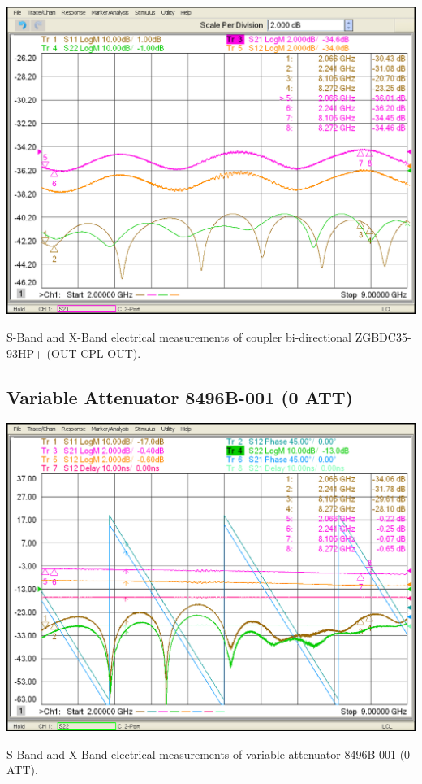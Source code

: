 \begin{table}[H]
	\centering
	\includegraphics[width=0.8\linewidth]{figuras/measures/Coupler ZGBDC35-93HP+ (OUT-CPL OUT)}
	\caption{S-Band and X-Band electrical measurements of coupler bi-directional ZGBDC35-93HP+ (OUT-CPL OUT).}
	\label{fig:ZGBDC35-93HP+ (OUT-CPL OUT)}
\end{table}

\subsection{Variable Attenuator 8496B-001 (0 ATT)}

\begin{table}[H]
	\centering
	\includegraphics[width=0.8\linewidth]{figuras/measures/ATT-V 8496B-001 (0 ATT)}
	\caption{S-Band and X-Band electrical measurements of variable attenuator 8496B-001 (0 ATT).}
	\label{fig:8496B-001(0 ATT)}
\end{table}



